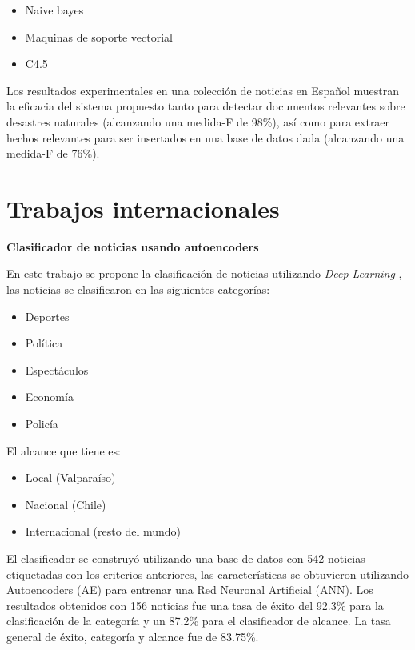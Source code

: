 \begin{itemize}
	\item Naive bayes
	\item Maquinas de soporte vectorial
	\item C4.5
\end{itemize} 

Los resultados experimentales en una colección de noticias en Español muestran la eficacia del sistema propuesto tanto para detectar documentos relevantes sobre desastres naturales (alcanzando una medida-F de 98\%), así como para extraer hechos relevantes para ser insertados en una base de datos dada (alcanzando una medida-F de 76\%).


\section[Trabajos i.]{Trabajos internacionales}

\begin{large}
	 \textbf{Clasificador de noticias usando autoencoders}\\
\end{large}

En este trabajo se propone la clasificación de noticias utilizando \textit{Deep Learning} \citep{CD3}, las noticias se clasificaron en las siguientes categorías:

\begin{itemize}
	\item Deportes
	\item Política
	\item Espectáculos
	\item Economía
	\item Policía
\end{itemize}
El alcance que tiene es:
\begin{itemize}
	\item Local (Valparaíso)
	\item Nacional (Chile)
	\item Internacional (resto del mundo)
\end{itemize}

El clasificador se construyó utilizando una base de datos con 542 noticias etiquetadas con los criterios anteriores, las características se obtuvieron utilizando Autoencoders (AE) para entrenar una Red Neuronal Artificial (ANN).
Los resultados obtenidos con 156 noticias fue una tasa de éxito del 92.3\% para la clasificación de la categoría y un 87.2\% para el clasificador de alcance.
La tasa general de éxito, categoría y alcance fue de 83.75\%.\\

